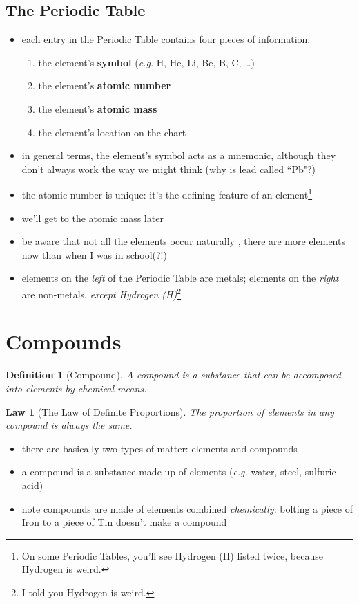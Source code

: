 \documentclass[11pt, oneside]{article}   	%
\newtheorem{definition}{Definition}
\newtheorem{law}{Law}
\begin{document}
\subsection{The Periodic Table}
\begin{itemize}
\item each entry in the Periodic Table contains four pieces of information:
\begin{enumerate}
\item the element's \textbf{symbol} (\emph{e.g.} H, He, Li, Be, B, C, \ldots)
\item the element's \textbf{atomic number}
\item the element's \textbf{atomic mass}
\item the element's location on the chart
\end{enumerate}
\item in general terms, the element's symbol acts as a mnemonic, although they don't always work the way we might think (why is lead called ``Pb"?)
\item the atomic number is unique: it's the defining feature of an element\footnote{On some Periodic Tables, you'll see Hydrogen (H) listed twice, because Hydrogen is weird.}
\item we'll get to the atomic mass later
\item be aware that not all the elements occur naturally \cite[p. 76]{wile-chem-2}, there are more elements now than when I was in school(?!)
\item elements on the \emph{left} of the Periodic Table are metals; elements on the \emph{right} are non-metals, \emph{except Hydrogen (H)}\footnote{I told you Hydrogen is weird.}
\end{itemize}

\section{Compounds}
\begin{definition}[Compound]
A compound is a substance that can be decomposed into elements by chemical means.
\end{definition}

\begin{law}[The Law of Definite Proportions]\label{law-definite-proportions}
The proportion of elements in any compound is always the same.
\end{law}

\begin{itemize}
\item there are basically two types of matter: elements and compounds
\item a compound is a substance made up of elements (\emph{e.g.} water, steel, sulfuric acid)
\item note compounds are made of elements combined \emph{chemically}: bolting a piece of Iron to a piece of Tin doesn't make a compound
\end{itemize}
\end{document}
